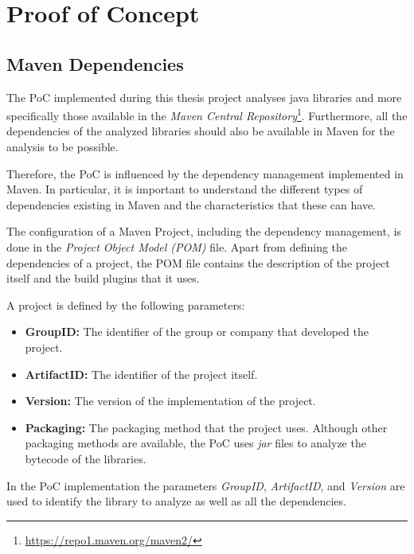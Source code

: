 \chapter{Proof of Concept}\label{ch:PoC}

\section{Maven Dependencies}
The PoC implemented during this thesis project analyses java libraries and more specifically those available in the \textit{Maven Central Repository}\footnote{\url{https://repo1.maven.org/maven2/}}. Furthermore, all the dependencies of the analyzed libraries should also be available in Maven for the analysis to be possible.

Therefore, the PoC is influenced by the dependency management implemented in Maven. In particular, it is important to understand the different types of dependencies existing in Maven and the characteristics that these can have.

The configuration of a Maven Project, including the dependency management, is done in the \textit{Project Object Model (POM)} file. Apart from defining the dependencies of a project, the POM file contains the description of the project itself and the build plugins that it uses.

A project is defined by the following parameters:

\begin{itemize}
  \item \textbf{GroupID:} The identifier of the group or company that developed the project.
  \item \textbf{ArtifactID:} The identifier of the project itself.
  \item \textbf{Version:} The version of the implementation of the project.
  \item \textbf{Packaging:} The packaging method that the project uses. Although other packaging methods are available, the PoC uses \textit{jar} files to analyze the bytecode of the libraries.
\end{itemize}

In the PoC implementation the parameters \textit{GroupID}, \textit{ArtifactID}, and \textit{Version} are used to identify the library to analyze as well as all the dependencies.

